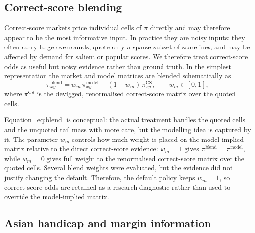 \documentclass[11pt]{article}
\begin{document}
\subsection{Correct-score blending}

Correct-score markets price individual cells of $\pi$ directly and may therefore appear to
be the most informative input. In practice they are noisy inputs: they often carry large overrounds, quote only a sparse subset of scorelines, and may be affected by demand for salient or popular scores.
We therefore treat correct-score odds as useful but noisy evidence rather than ground truth. In the simplest representation the market and model matrices are blended
schematically as
\begin{equation}
\pi^{\mathrm{blend}}_{xy}=w_m\,\pi^{\mathrm{model}}_{xy}+(1-w_m)\,\pi^{\mathrm{CS}}_{xy},
\qquad w_m\in[0,1],
\label{eq:blend}
\end{equation}
where $\pi^{\mathrm{CS}}$ is the devigged, renormalised correct-score matrix over the quoted cells. 

Equation~\eqref{eq:blend} is conceptual: the actual treatment handles the quoted cells and
the unquoted tail mass with more care, but the modelling idea is captured by it. The
parameter $w_m$ controls how much weight is placed on the model-implied matrix relative
to the direct correct-score evidence: $w_m=1$ gives
$\pi^{\mathrm{blend}}=\pi^{\mathrm{model}}$, while $w_m=0$ gives full weight to the
renormalised correct-score matrix over the quoted cells. Several blend weights were
evaluated, but the evidence did not justify changing the default. Therefore, the default
policy keeps $w_m=1$, so correct-score odds are retained as a research diagnostic rather
than used to override the model-implied matrix.

\subsection{Asian handicap and margin information}
\end{document}
